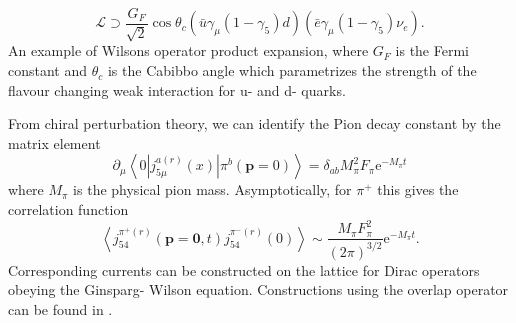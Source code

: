 \documentclass[a4paper,10pt]{book}
\begin{document}
\begin{equation}
\mathcal{L} \supset \frac{G_{F}}{\sqrt{2}} \cos \theta_{c}\left(\bar{u} \gamma_{\mu}\left(1-\gamma_{5}\right) d\right)\left(\bar{e} \gamma_{\mu}\left(1-\gamma_{5}\right) \nu_{e}\right).
\end{equation}
An example of Wilsons operator product expansion,
where $G_F$ is the Fermi constant and $\theta_c$ is the Cabibbo angle which parametrizes the strength of  the flavour changing weak interaction for u- and d- quarks. \par From chiral perturbation theory, we can identify the Pion decay constant by the matrix element 
\begin{equation}
\partial_{\mu}\left\langle 0\left|j_{5\mu}^{a(r)}(x)\right| \pi^{b}(\boldsymbol{p}=0)\right\rangle=\delta_{a b} M_{\pi}^{2} F_{\pi} \mathrm{e}^{-M_{\pi} t}
\end{equation}
where $M_\pi$ is the physical pion mass\cite{WeinbergSteven1979PL}\cite{gasser1985chiral}. Asymptotically, for $\pi^+$ this gives the correlation function
\begin{equation}\label{eq:decay_constant}
\left\langle j_{54}^{\pi^+(r)}(\boldsymbol{p}=\mathbf{0}, t) j_{54}^{\pi^-(r)}(0)\right\rangle \sim \frac{M_{\pi} F_{\pi}^{2}}{(2\pi)^{3/2}} \mathrm{e}^{-M_{\pi} t}.
\end{equation}
Corresponding currents can be constructed on the lattice for Dirac operators obeying the Ginsparg- Wilson equation. Constructions using the overlap operator can be found in \cite{hasenfratz1998lattice}\cite{kikukawa1999axial}. 
\end{document}
